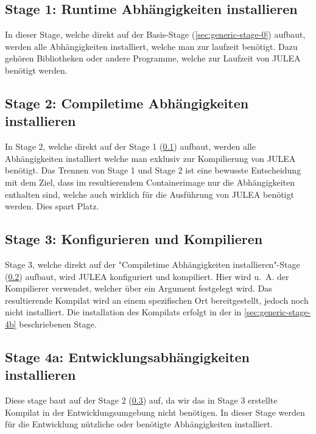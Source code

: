 \subsection{Stage 1: Runtime Abhängigkeiten installieren} \label{sec:generic-stage-1}

In dieser Stage, welche direkt auf der Basis-Stage (\cref{sec:generic-stage-0}) aufbaut, werden alle Abhängigkeiten installiert, welche man zur laufzeit benötigt. Dazu gehören Bibliotheken oder andere Programme, welche zur Laufzeit von JULEA benötigt werden.


\subsection{Stage 2: Compiletime Abhängigkeiten installieren} \label{sec:generic-stage-2}

In Stage 2, welche direkt auf der Stage 1 (\cref{sec:generic-stage-1}) aufbaut, werden alle Abhängigkeiten installiert welche man exklusiv zur Kompilierung von JULEA benötigt. Das Trennen von Stage 1 und Stage 2 ist eine bewusste Entscheidung mit dem Ziel, dass im resultierendem Containerimage nur die Abhängigkeiten enthalten sind, welche auch wirklich für die Ausführung von JULEA benötigt werden. Dies spart Platz.

\subsection{Stage 3: Konfigurieren und Kompilieren} \label{sec:generic-stage-3}

Stage 3, welche direkt auf der "Compiletime Abhängigkeiten installieren"-Stage (\cref{sec:generic-stage-2}) aufbaut, wird JULEA konfiguriert und kompiliert. Hier wird u. A. der Kompilierer verwendet, welcher über ein Argument festgelegt wird. Das resultierende Kompilat wird an einem spezifischen Ort bereitgestellt, jedoch noch nicht installiert. Die installation des Kompilats erfolgt in der in \cref{sec:generic-stage-4b} beschriebenen Stage.

\subsection{Stage 4a: Entwicklungsabhängigkeiten installieren} \label{sec:generic-stage-4a}

Diese stage baut auf der Stage 2 (\cref{sec:generic-stage-3}) auf, da wir das in Stage 3 erstellte Kompilat in der Entwicklungsumgebung nicht benötigen. 
In dieser Stage werden für die Entwicklung nützliche oder benötigte Abhängigkeiten installiert. 

